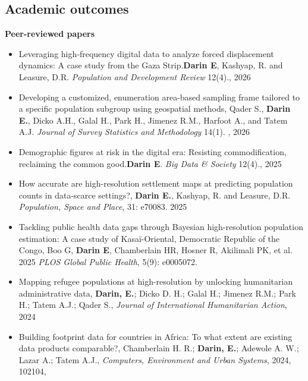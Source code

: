 \documentclass[
]{friggeri-cv}
\begin{document}
\clearpage

\begin{noside}
\section{Academic outcomes}
\textbf{Peer-reviewed papers}
\begin{itemize}
\item Leveraging high‐frequency digital data to analyze forced displacement dynamics: A case study from the Gaza Strip.\textbf{Darin E}, Kashyap, R. and Leasure, D.R. \textit{Population and Development Review} 12(4).\href{https://doi.org/10.1111/padr.70064}{\scriptsize{}}, 2026
\item Developing a customized, enumeration area-based sampling frame tailored to a specific population subgroup using geospatial methods, Qader S., \textbf{Darin E.}, Dicko A.H., Galal H., Park H., Jimenez R.M., Harfoot A., and Tatem A.J. \textit{Journal of Survey Statistics and Methodology} 14(1). \href{https://doi.org/10.1093/jssam/smaf027}{\scriptsize{}}, 2026
\item Demographic figures at risk in the digital era: Resisting commodification, reclaiming the common good.\textbf{Darin E}. \textit{Big Data \& Society} 12(4).\href{https://doi.org/10.1177/20539517251403948}{\scriptsize{}}, 2025
\item  How accurate are high-resolution settlement maps at predicting population counts in data-scarce settings?, \textbf{Darin E.}, Kashyap, R. and Leasure, D.R.  \textit{Population, Space and Place}, 31: e70083. 2025 \href{https://doi.org/10.1002/psp.70083}{\scriptsize{}}
\item Tackling public health data gaps through Bayesian high-resolution population estimation: A case study of Kasaï-Oriental, Democratic Republic of the Congo, Boo G, \textbf{Darin E}, Chamberlain HR, Hosner R, Akilimali PK, et al. 2025 \textit{PLOS Global Public Health}, 5(9): e0005072. \href{https://doi.org/10.1371/journal.pgph.0005072}{\scriptsize{}}
\item Mapping refugee populations at high-resolution by unlocking humanitarian administrative data, \textbf{Darin, E.}; Dicko D. H.;  Galal H.; Jimenez R.M.; Park H.;  Tatem A.J.; Qader S., \textit{Journal of International Humanitarian Action}, 2024 \href{https://doi.org/10.1186/s41018-024-00157-6}{\scriptsize{}}
\item Building footprint data for countries in Africa: To what extent are existing data products comparable?, Chamberlain H. R.; \textbf{Darin, E.}; Adewole A. W.; Lazar A.; Tatem A.J., \textit{Computers, Environment and Urban Systems}, 2024, 102104, \href{https://doi.org/10.1016/j.compenvurbsys.2024.102104}{\scriptsize{}}

\end{itemize}
\end{noside}
\end{document}
